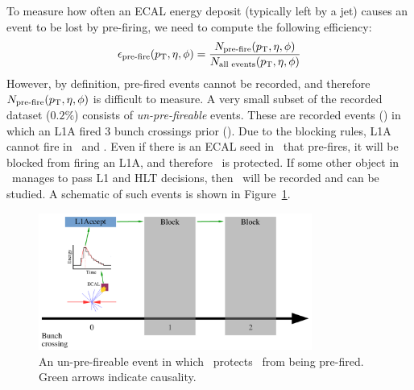 To measure how often an ECAL energy deposit (typically left by a jet) causes an event to be lost by pre-firing, we need to compute the following efficiency:
\begin{equation}
    \epsilon_\text{pre-fire}(p_\mathrm{T},\eta,\phi) = \frac{N_\text{pre-fire}(p_\mathrm{T},\eta,\phi)}{N_\text{all events}(p_\mathrm{T},\eta,\phi)}
\end{equation}
However, by definition, pre-fired events cannot be recorded, and therefore $N_\text{pre-fire}(p_\mathrm{T},\eta,\phi)$ is difficult to measure.
A very small subset of the recorded dataset ($0.2\%$) consists of \emph{un-pre-fireable} events.
These are recorded events () in which an L1A fired 3 bunch crossings prior ().
Due to the blocking rules, L1A cannot fire in ~and .
Even if there is an ECAL seed in ~that pre-fires, it will be blocked from firing an L1A, and therefore ~is protected.
If some other object in ~manages to pass L1 and HLT decisions, then ~will be recorded and can be studied.
A schematic of such events is shown in Figure~\ref{fig:vbf:pre3}.

\begin{figure}
    \begin{center}
        \includegraphics[width=0.8\textwidth,page=3]{figures/vbf/triggers/l1diag.pdf}
        \caption{An un-pre-fireable event in which ~protects ~from being pre-fired. 
                 Green arrows indicate causality.}
        \label{fig:vbf:pre3}
    \end{center}
\end{figure}

